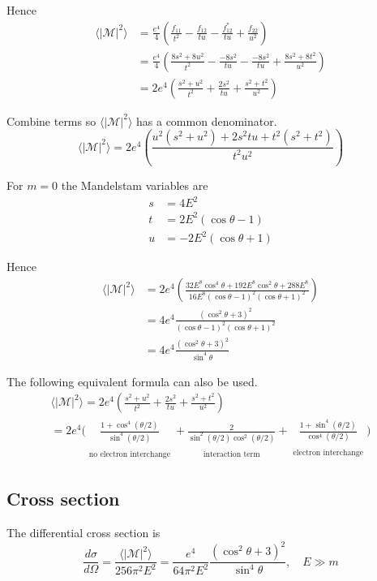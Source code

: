 \documentclass[12pt]{article}
\begin{document}
Hence
\begin{align*}
\langle|\mathcal{M}|^2\rangle
&=\frac{e^4}{4}
\left(
\frac{f_{11}}{t^2}-\frac{f_{12}}{tu}-\frac{f_{12}^*}{tu}+\frac{f_{22}}{u^2}
\right)
\\
&=\frac{e^4}{4}
\left(
\frac{8s^2+8u^2}{t^2}-\frac{-8s^2}{tu}-\frac{-8s^2}{tu}+\frac{8s^2+8t^2}{u^2}
\right)
\\
&=2e^4
\left(
\frac{s^2+u^2}{t^2}+\frac{2s^2}{tu}+\frac{s^2+t^2}{u^2}
\right)
\end{align*}

Combine terms so $\langle|\mathcal{M}|^2\rangle$ has a common denominator.
\begin{equation*}
\langle|\mathcal{M}|^2\rangle
=2e^4
\left(
\frac{u^2(s^2+u^2)+2s^2tu+t^2(s^2+t^2)}{t^2u^2}
\right)
\end{equation*}

For $m=0$ the Mandelstam variables are
\begin{align*}
s&=4E^2
\\
t&=2E^2(\cos\theta-1)
\\
u&=-2E^2(\cos\theta+1)
\end{align*}

Hence
\begin{align*}
\langle|\mathcal{M}|^2\rangle
&=2e^4
\left(
\frac{32E^8\cos^4\theta+192E^8\cos^2\theta+288E^8}{16E^8(\cos\theta-1)^2(\cos\theta+1)^2}
\right)
\\
&=4e^4\frac{\left(\cos^2\theta+3\right)^2}{(\cos\theta-1)^2(\cos\theta+1)^2}
\\
&=4e^4
\frac{(\cos^2\theta+3)^2}{\sin^4\theta}
\end{align*}

The following equivalent formula can also be used.
\begin{multline*}
\langle|\mathcal{M}|^2\rangle
=2e^4
\left(
\frac{s^2+u^2}{t^2}+\frac{2s^2}{tu}+\frac{s^2+t^2}{u^2}
\right)
\\
=2e^4\bigg(
\underset{\substack{\\[1ex]\text{no electron interchange}}}
{\frac{1+\cos^4(\theta/2)}{\sin^4(\theta/2)}}
+
\underset{\substack{\\[1ex]\text{interaction term}}}
{\frac{2}{\sin^2(\theta/2)\cos^2(\theta/2)}}
+
\underset{\substack{\\[1ex]\text{electron interchange}}}
{\frac{1+\sin^4(\theta/2)}{\cos^4(\theta/2)}}
\bigg)
\end{multline*}

\subsection*{Cross section}
The differential cross section is
\begin{equation*}
\frac{d\sigma}{d\Omega}
=\frac{\langle|\mathcal{M}|^2\rangle}{256\pi^2E^2}
=\frac{e^4}{64\pi^2E^2}
\frac{(\cos^2\theta+3)^2}{\sin^4\theta},
\quad E\gg m
\end{equation*}
\end{document}
